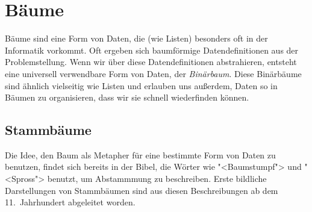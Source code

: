 
\chapter{Bäume}
\label{cha:trees}

Bäume sind eine Form von Daten, die (wie Listen) besonders
oft in der Informatik vorkommt.  Oft ergeben sich baumförmige
Datendefinitionen aus der Problemstellung.  Wenn wir über diese
Datendefinitionen abstrahieren, entsteht eine universell verwendbare
Form von Daten, der \textit{Binärbaum}.  Diese
Binärbäume sind ähnlich vielseitig wie Listen und erlauben uns
außerdem, Daten so in Bäumen zu organisieren, dass wir sie schnell
wiederfinden können.

\section{Stammbäume}

Die Idee, den Baum als Metapher für eine bestimmte Form von Daten zu
benutzen, findet sich bereits in der Bibel, die Wörter wie
"<Baumstumpf"> und "<Spross"> benutzt, um Abstammmung zu beschreiben.
Erste bildliche Darstellungen von Stammbäumen sind aus diesen
Beschreibungen ab dem 11.\ Jahrhundert abgeleitet worden.

